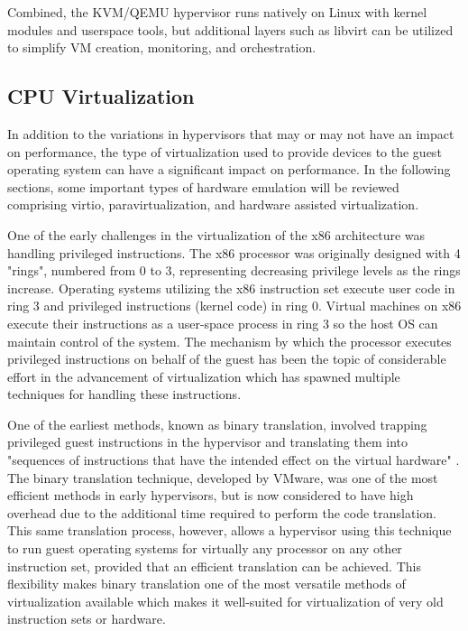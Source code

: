 Combined, the KVM/QEMU hypervisor runs natively on Linux with kernel modules and userspace tools, but additional layers such as libvirt \autocite{_libvirt_1} can be utilized to simplify VM creation, monitoring, and orchestration.


\subsection{CPU Virtualization}
\label{sec:vtcpu}
In addition to the variations in hypervisors that may or may not have an impact on performance, the type of virtualization used to provide devices to the guest operating system can have a significant impact on performance.
In the following sections, some important types of hardware emulation will be reviewed comprising virtio, paravirtualization, and hardware assisted virtualization.

One of the early challenges in the virtualization of the x86 architecture was handling privileged instructions.
The x86 processor was originally designed with 4 "rings", numbered from 0 to 3, representing decreasing privilege levels as the rings increase.
Operating systems utilizing the x86 instruction set execute user code in ring 3 and privileged instructions (kernel code) in ring 0.
Virtual machines on x86 execute their instructions as a user-space process in ring 3 so the host OS can maintain control of the system.
The mechanism by which the processor executes privileged instructions on behalf of the guest has been the topic of considerable effort in the advancement of virtualization which has spawned multiple techniques for handling these instructions.

One of the earliest methods, known as binary translation, involved trapping privileged guest instructions in the hypervisor and translating them into "sequences of instructions that have the intended effect on the virtual hardware" \autocite{vmwareVT}.
The binary translation technique, developed by VMware, was one of the most efficient methods in early hypervisors, but is now considered to have high overhead due to the additional time required to perform the code translation.
This same translation process, however, allows a hypervisor using this technique to run guest operating systems for virtually any processor on any other instruction set, provided that an efficient translation can be achieved.
This flexibility makes binary translation one of the most versatile methods of virtualization available which makes it well-suited for virtualization of very old instruction sets or hardware.

